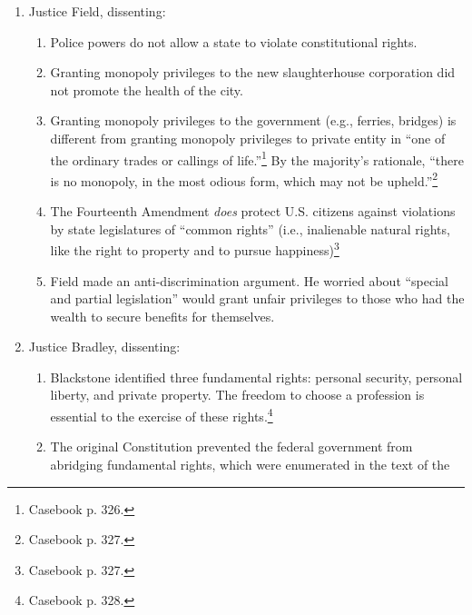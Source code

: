 \begin{enumerate}
\begin{enumerate}
        \item \textbf{Butchers' Argument 4}: the statute denied equal protection.
        \begin{enumerate}
            \item No. The equal protection clause applies only to 
            slavery.\footnote{Casebook p. 326.}
        \end{enumerate}
    \end{enumerate}
    \item Justice Field, dissenting:
    \begin{enumerate}
        \item Police powers do not allow a state to violate constitutional 
        rights.
        \item Granting monopoly privileges to the new slaughterhouse 
        corporation did not promote the health of the city.
        \item Granting monopoly privileges to the government (e.g., ferries, 
        bridges) is different from granting monopoly privileges to private 
        entity in ``one of the ordinary trades or callings of 
        life.''\footnote{Casebook p. 326.} By the majority's rationale, 
        ``there is no monopoly, in the most odious form, which may not be 
        upheld.''\footnote{Casebook p. 327.}
        \item The Fourteenth Amendment \emph{does} protect U.S. citizens 
        against violations by state legislatures of ``common 
        rights'' (i.e., inalienable natural rights, like the right to property 
        and to pursue happiness)\footnote{Casebook p. 327.}
        \item Field made an anti-discrimination argument. He worried about 
        ``special and partial legislation'' would grant unfair privileges to 
        those who had the wealth to secure benefits for themselves.
    \end{enumerate}
    \item Justice Bradley, dissenting:
    \begin{enumerate}
        \item Blackstone identified three fundamental rights: personal 
        security, personal liberty, and private property. The freedom to choose a 
        profession is essential to the exercise of these 
        rights.\footnote{Casebook p. 328.}
        \item The original Constitution prevented the federal government from 
        abridging fundamental rights, which were enumerated in the text of the 

\end{enumerate}
\end{enumerate}
